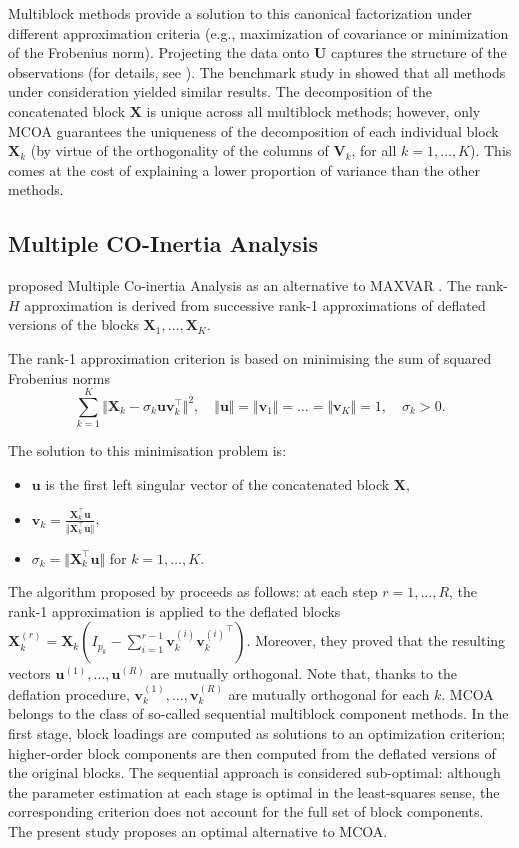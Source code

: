 \documentclass[11pt]{article}
\newcommand{\X}{\textbf{X}}
\newcommand{\U}{\textbf{U}}
\newcommand{\V}{\textbf{V}}
\renewcommand{\u}{\textbf{u}}
\renewcommand{\v}{\textbf{v}}
\begin{document}
\noindent Multiblock methods provide a solution to this canonical factorization 
under different approximation criteria (e.g., maximization of covariance or 
minimization of the Frobenius norm). Projecting the data onto $\U$ captures the 
structure of the observations (for details, see \cite{Bougeard024}). The benchmark 
study in \cite{Bougeard024} showed that all methods under consideration yielded 
similar results. The decomposition of the concatenated block $\X$ is unique across 
all multiblock methods; however, only MCOA guarantees the uniqueness of the 
decomposition of each individual block $\X_k$ (by virtue of the orthogonality of 
the columns of $\V_k$, for all $k=1,\ldots,K$). This comes  at the cost of explaining a lower proportion of variance than the other methods.

\subsection{Multiple CO-Inertia Analysis}
\cite{Chessel96} proposed Multiple Co-inertia Analysis as an alternative to MAXVAR \cite{Carroll68}. The rank-$H$ approximation is derived from successive rank-1 approximations of deflated versions of the blocks $\X_1,\ldots,\X_K$.

The rank-1 approximation criterion is based on minimising the sum of squared Frobenius norms
\begin{equation}
    \sum_{k=1}^K\Vert \X_k - \sigma_{k}\u\v_k^\intercal \Vert^2, \quad \Vert \u\Vert = \Vert \v_1\Vert = \ldots = \Vert \v_K\Vert = 1, \quad \sigma_k > 0. \label{mcoa_c}
\end{equation}

\noindent The solution to this minimisation problem is:
\begin{itemize}
  \item $\u$ is the first left singular vector of the concatenated block $\X$,
  \item $\v_k = \frac{\X_k^\intercal \u}{\Vert \X_k^\intercal \u \Vert}$,
  \item $\sigma_k = \Vert \X_k^\intercal \u \Vert$ for $k = 1, \ldots, K$.
\end{itemize}
 

The algorithm proposed by \cite{Chessel96} proceeds as follows: at each step $r = 1, \ldots, R$, the rank-1 approximation is applied to the deflated blocks $\X_k^{(r)} = \X_k(I_{p_k}-\sum_{i=1}^{r-1}\v_k^{(i)}{\v_k^{(i)}}^\intercal)$. Moreover, they proved that the resulting vectors $\u^{(1)}, \ldots, \u^{(R)}$ are mutually orthogonal. Note that, thanks to the deflation procedure,  $\v_k^{(1)}, \ldots, \v_k^{(R)}$ are mutually orthogonal for each $k$.
MCOA belongs to the class of so-called sequential multiblock component methods. In the first stage, block loadings are computed as solutions to an optimization criterion; higher-order block components are then computed from the deflated versions of the original blocks. The sequential approach is considered sub-optimal: 
although the parameter estimation at each stage is optimal in the least-squares sense, the corresponding criterion does not account for the full set of block components. The present study proposes an optimal alternative to MCOA.
\end{document}
